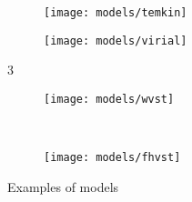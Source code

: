 \begin{figure}[p!]
\begin{subfigure}{0.3\linewidth}
		\parbox[c]{0.1\linewidth}{\caption{}%
			\label{pyg:fgr:temkinex}}

		\parbox[b]{0.7\linewidth}{%

			\texttt{[image: models/temkin]}}
	\end{subfigure}
	\begin{subfigure}{0.3\linewidth}

		\parbox[c]{0.1\linewidth}{\caption{}%
			\label{pyg:fgr:virialex}}

		\parbox[b]{0.7\linewidth}{%

			\texttt{[image: models/virial]}}
	\end{subfigure}3
	\begin{subfigure}{0.3\linewidth}

		\parbox[c]{0.1\linewidth}{\caption{}%
			\label{pyg:fgr:wsvstex}}

		\parbox[b]{0.7\linewidth}{%

			\texttt{[image: models/wvst]}}
	\end{subfigure}
	\\
	\begin{subfigure}{0.3\linewidth}

		\parbox[c]{0.1\linewidth}{\caption{}%
			\label{pyg:fgr:fhvstex}}

		\parbox[b]{0.7\linewidth}{%

			\texttt{[image: models/fhvst]}}
	\end{subfigure}

	\caption{Examples of models
	}%
	\label{pyg:fgr:modelex}
\end{figure}